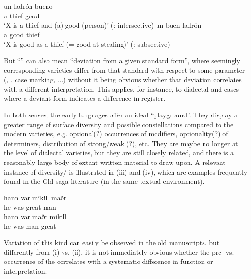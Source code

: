 \begin{refsection}
\begin{exe}
     \gll un ladrón bueno \\
                  a thief good  \\ 
              \glt  `X is a thief and (a) good (person)' \hfill                 (: intersective)     
     \gll un buen ladrón \\
                    a good thief  \\ 
            \glt `X is good as a thief (= good at stealing)' \hfill   (: subsective)
\end{exe}

But ``'' can also mean ``deviation from a given standard form'', where seemingly corresponding varieties differ from that standard with respect to some parameter (, , case marking, ...) without it being obvious whether that deviation correlates with a different interpretation. This applies, for instance, to dialectal  and cases where a deviant form indicates a difference in register.    
 
In both senses, the early  languages offer an ideal ``playground''. They display a greater range of surface diversity and possible constellations compared to the modern  varieties, e.g. optional(?)  occurrences of modifiers, optionality(?) of determiners, distribution of strong/weak (?), etc. They are maybe no longer at the level of dialectal varieties, but they are still closely related, and there is a reasonably large body of extant written material to draw upon. A relevant instance of diversity/ is illustrated in (iii) and (iv), which are examples frequently found in the Old  saga literature (in the same textual environment).  

\begin{exe}
     \gll hann var mikill maðr \\ 
                  he was great man  \\ 
     \gll hann var maðr mikill \\
                 he was man great \\ 
\end{exe}


	 
Variation of this kind can easily be observed in the old manuscripts, but differently from (i) vs. (ii), it is not immediately obvious whether the pre- vs.  occurrence of the  correlates with a systematic difference in function or interpretation. 
 

\end{refsection}
